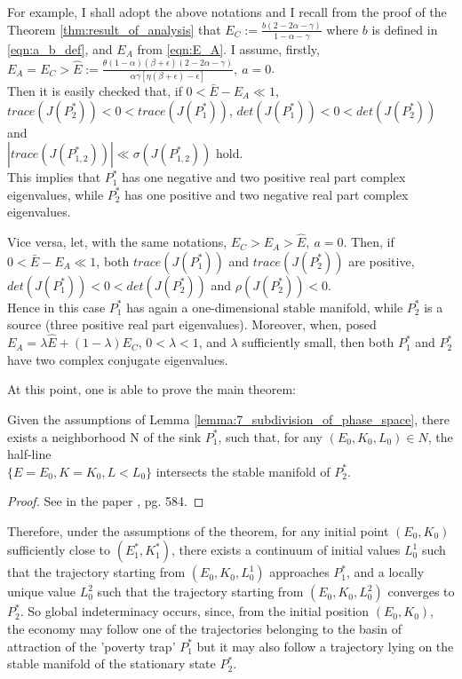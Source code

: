 For example, I shall adopt the above notations and I recall from the proof of the Theorem \ref{thm:result_of_analysis} that $E_C := \frac{b(2-2\alpha-\gamma)}{1-\alpha-\gamma}$ where $b$ is defined in \eqref{eqn:a_b_def}, and $E_A$ from \eqref{eqn:E_A}. I assume, firstly, 
$E_A=E_C>\widehat{E}:=\frac{\theta(1-\alpha)(\beta+\epsilon)(2-2\alpha-\gamma)}{\alpha\gamma[\eta(\beta+\epsilon)-\epsilon]},\ a=0$.\\
Then it is easily checked that, if $0<\bar{E}-E_A\ll 1$, \\
$trace(J(P_2^*))<0<trace(J(P_1^*))$, $det(J(P_1^*))<0<det(J(P_2^*))$ and\\
$|trace(J(P_{1,2}^*))|\ll \sigma(J(P_{1,2}^*))$ hold.\\
This implies that $P_1^*$ has one negative and two positive real part complex eigenvalues, while $P_2^*$ has one positive and two negative real part complex eigenvalues.

Vice versa, let, with the same notations, $E_C>E_A>\widehat{E},\ a=0.$ Then, if $0<\bar{E}-E_A\ll 1$, both $trace(J(P_1^*))$ and $trace(J(P_2^*))$ are positive,\\ $det(J(P_1^*))<0<det(J(P_2^*))$ and $\rho(J(P_2^*))<0$.\\
Hence in this case $P_1^*$ has again a one-dimensional stable manifold, while $P_2^*$ is a source (three positive real part eigenvalues). Moreover, when, posed $E_A=\lambda\widehat{E}+(1-\lambda)E_C$, $0<\lambda<1$, and $\lambda$ sufficiently small, then both $P_1^*$ and $P_2^*$ have two complex conjugate eigenvalues.

At this point, one is able to prove the main theorem: 
\begin{thm}\label{thm:10_neighbor_of_P1_inters_manifold_P2}
	Given the assumptions of Lemma \ref{lemma:7_subdivision_of_phase_space}, there exists a neighborhood N of the sink $P_1^*$, such that, for any $(E_0,K_0,L_0)\in N$, the half-line \\$\{E=E_0,K = K_0,L < L_0\}$ intersects the stable manifold of $P_2^*$.
\end{thm}
\begin{proof}
	See in the paper \cite{antoci_poverty_2011}, pg. 584. 
\end{proof}
Therefore, under the assumptions of the theorem, for any initial point $(E_0, K_0)$ sufficiently close to $(E_1^*, K_1^*)$, there exists a continuum of initial values $L_0^1$ such that the trajectory starting from $(E_0, K_0, L_0^1)$ approaches $P_1^*$, and a locally unique value $L_0^2$ such that the trajectory starting from $(E_0, K_0,L_0^2)$ converges to $P_2^*$. So global indeterminacy occurs, since, from the initial position $(E_0, K_0)$, the economy may follow one of the trajectories belonging to the basin of attraction of the 'poverty trap' $P_1^*$ but it may also follow a trajectory lying on the stable manifold of the stationary state $P_2^*$.

